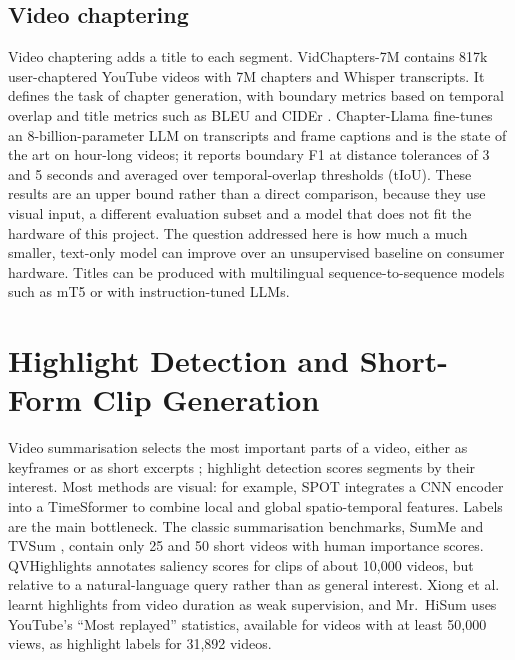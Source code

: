 \subsection*{Video chaptering}

Video chaptering adds a title to each segment. VidChapters-7M \cite{yang2023vidchapters} contains 817k user-chaptered YouTube videos with 7M chapters and Whisper transcripts. It defines the task of chapter generation, with boundary metrics based on temporal overlap and title metrics such as BLEU \cite{papineni2002bleu} and CIDEr \cite{vedantam2015cider}. Chapter-Llama \cite{ventura2025chapterllama} fine-tunes an 8-billion-parameter LLM on transcripts and frame captions and is the state of the art on hour-long videos; it reports boundary F1 at distance tolerances of 3 and 5 seconds and averaged over temporal-overlap thresholds (tIoU). These results are an upper bound rather than a direct comparison, because they use visual input, a different evaluation subset and a model that does not fit the hardware of this project. The question addressed here is how much a much smaller, text-only model can improve over an unsupervised baseline on consumer hardware. Titles can be produced with multilingual sequence-to-sequence models such as mT5 \cite{xue2021mt5} or with instruction-tuned LLMs.

\section{Highlight Detection and Short-Form Clip Generation}

Video summarisation selects the most important parts of a video, either as keyframes or as short excerpts \cite{apostolidis2021survey}; highlight detection scores segments by their interest. Most methods are visual: for example, SPOT \cite{kwak2025spot} integrates a CNN encoder into a TimeSformer to combine local and global spatio-temporal features. Labels are the main bottleneck. The classic summarisation benchmarks, SumMe \cite{gygli2014summe} and TVSum \cite{song2015tvsum}, contain only 25 and 50 short videos with human importance scores. QVHighlights \cite{lei2021qvhighlights} annotates saliency scores for clips of about 10{,}000 videos, but relative to a natural-language query rather than as general interest. Xiong et al.\ \cite{xiong2019lessismore} learnt highlights from video duration as weak supervision, and Mr.~HiSum \cite{sul2023mrhisum} uses YouTube's ``Most replayed'' statistics, available for videos with at least 50{,}000 views, as highlight labels for 31{,}892 videos.

